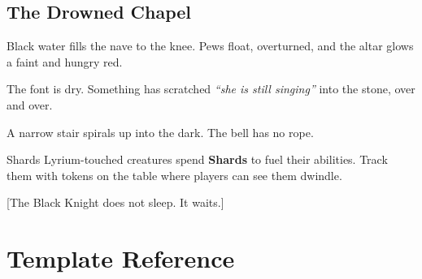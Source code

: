 \documentclass{apotheosis-book} %
\begin{document}
\begin{segment}
\section{The Drowned Chapel}
Black water fills the nave to the knee. Pews float, overturned, and the
altar glows a faint and hungry red.

The font is dry. Something has scratched \emph{``she is still singing''}
into the stone, over and over.

A narrow stair spirals up into the dark. The bell has no rope.


\begin{note}{Shards}
  Lyrium-touched creatures spend \textbf{Shards} to fuel their abilities.
  Track them with tokens on the table where players can see them dwindle.
\end{note}
\end{segment}

[The Black Knight does not sleep. It waits.]

\chapter*{Template Reference}
\end{document}
